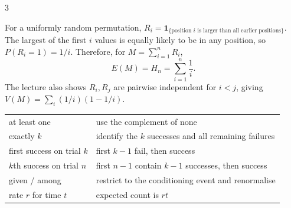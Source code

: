 \documentclass[10pt]{article}
\newcommand{\ind}[1]{\mathbf 1_{\{#1\}}}
\newcommand{\boxstart}[1]{\begin{tcolorbox}[title={#1},sharp corners]}
\newcommand{\boxend}{\end{tcolorbox}}
\begin{document}
\begin{multicols*}{3}
	\boxstart{L3 — Record indicators}
	For a uniformly random permutation, $R_i=\ind{\text{position $i$ is larger than all earlier positions}}$. The largest of the first $i$ values is equally likely to be in any position, so $P(R_i=1)=1/i$. Therefore, for $M=\sum_{i=1}^nR_i$,
	\[
		E(M)=H_n=\sum_{i=1}^n\frac1i.
	\]
	The lecture also shows $R_i,R_j$ are pairwise independent for $i<j$, giving $V(M)=\sum_i(1/i)(1-1/i)$.
	\boxend

	\boxstart{L1–L3 — Common wording translations}
	\begin{tabularx}{\linewidth}{@{}lX@{}}
		at least one               & use the complement of none                            \\
		exactly $k$                & identify the $k$ successes and all remaining failures \\
		first success on trial $k$ & first $k-1$ fail, then success                        \\
		$k$th success on trial $n$ & first $n-1$ contain $k-1$ successes, then success     \\
		given / among              & restrict to the conditioning event and renormalise    \\
		rate $r$ for time $t$      & expected count is $rt$                                \\
	\end{tabularx}
	\boxend

\end{multicols*}

\newpage
\end{document}
